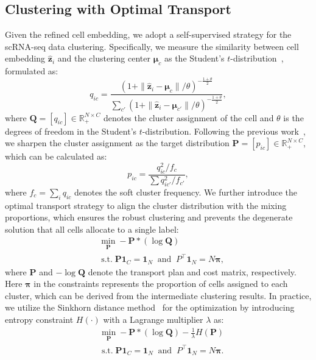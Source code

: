 \subsection{Clustering with Optimal Transport} Given the refined cell embedding, we adopt a self-supervised strategy for the scRNA-seq data clustering. Specifically, we measure the similarity between cell embedding $\hat{\bm{z}}_i$ and the clustering center $\bm{\mu}_c$ as the Student's $t$-distribution~\cite{maaten2008visualizing}, formulated as:
\begin{equation}
    q_{ic}=\frac{(1+\|\hat{\bm{z}}_i-\bm{\mu}_c\|/\theta)^{-\frac{1+\theta}{2}}}{\sum_{c'}(1+\|\hat{\bm{z}}_i-\bm{\mu}_{c'}\|/\theta)^{-\frac{1+\theta}{2}}},
\end{equation}
where $\bm{Q}=[q_{ic}]\in\mathbb{R}_{+}^{N\times C}$ denotes the cluster assignment of the cell and $\theta$ is the degrees of freedom in the Student’s $t$-distribution. Following the previous work~\cite{bo2020structural}, we sharpen the cluster assignment as the target distribution $\bm{P}=[p_{ic}]\in\mathbb{R}_{+}^{N\times C}$, which can be calculated as:
\begin{equation}
    p_{ic}=\frac{q_{ic}^2/f_c}{\sum q_{ic'}^2/f_{c'}},
\end{equation}
where $f_c=\sum_iq_{ic}$ denotes the soft cluster frequency. We further introduce the optimal transport strategy to align the cluster distribution with the mixing proportions, which ensures the robust clustering and prevents the degenerate solution that all cells allocate to a single label:
\begin{equation}
\begin{aligned}
    &\min_{\bm{P}}-\bm{P}*(\log\bm{Q})\\
    &\operatorname{s.t.} \bm{P}\bm{1}_C = \bm{1}_N \ \text{ and } \ P^\top\bm{1}_N = N\bm{\pi},
\end{aligned}
\end{equation}
where $\bm{P}$ and $-\log\bm{Q}$ denote the transport plan and cost matrix, respectively. Here $\bm{\pi}$ in the constraints represents the proportion of cells assigned to each cluster, which can be derived from the intermediate clustering results. In practice, we utilize the Sinkhorn distance method~\cite{sinkhorn1967diagonal} for the optimization by introducing entropy constraint $H(\cdot)$ with a Lagrange multiplier $\lambda$ as:
\begin{equation}
\begin{aligned}
    &\min_{\bm{P}}-\bm{P}*(\log\bm{Q})-\frac{1}{\lambda}H(\bm{P})\\
    &\operatorname{s.t.} \bm{P}\bm{1}_C = \bm{1}_N \ \text{ and } \ P^\top\bm{1}_N = N\bm{\pi}.
\end{aligned}
\end{equation}
